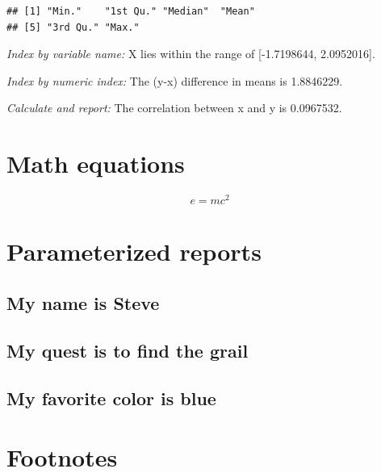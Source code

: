 \documentclass[]{article}
\begin{document}
\begin{verbatim}
## [1] "Min."    "1st Qu." "Median"  "Mean"   
## [5] "3rd Qu." "Max."
\end{verbatim}

\emph{Index by variable name:} X lies within the range of {[}-1.7198644,
2.0952016{]}.

\emph{Index by numeric index:} The (y-x) difference in means is
1.8846229.

\emph{Calculate and report:} The correlation between x and y is
0.0967532.

\hypertarget{math-equations}{%
\section{Math equations}\label{math-equations}}

\[e=mc^{2}\]

\hypertarget{parameterized-reports}{%
\section{Parameterized reports}\label{parameterized-reports}}

\hypertarget{my-name-is-steve}{%
\subsection{My name is Steve}\label{my-name-is-steve}}

\hypertarget{my-quest-is-to-find-the-grail}{%
\subsection{My quest is to find the
grail}\label{my-quest-is-to-find-the-grail}}

\hypertarget{my-favorite-color-is-blue}{%
\subsection{My favorite color is blue}\label{my-favorite-color-is-blue}}

\hypertarget{footnotes}{%
\section{Footnotes}\label{footnotes}}
\end{document}
